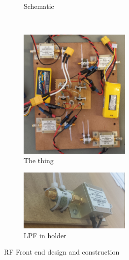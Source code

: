 \begin{figure}
  \centering
  \begin{subfigure}{\textwidth}
    \centering
    
    \caption{Schematic}
  \end{subfigure}\\[1em]
  \begin{subfigure}{\textwidth}
    \centering
    \includegraphics[width=0.6\textwidth]{rf-front-end-charging}
    \caption{The thing}
  \end{subfigure}
  \begin{subfigure}{\textwidth}
    \centering
    \includegraphics[width=0.6\textwidth]{lpf-in-holder}
    \caption{LPF in holder}
  \end{subfigure}
  \caption{RF Front end design and construction}
\end{figure}




